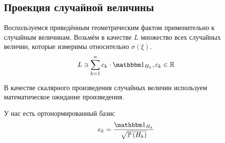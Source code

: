 \subsection{Проекция случайной величины}
Воспользуемся приведённым геометрическим фактом применительно к случайным
величинам.
Возьмём в качестве $L$ множество всех случайных величин, которые
измеримы относительно $\sigma\left( \xi \right)$.
$$L \ni \sum_{k=1}^n c_k \cdot \indicatorof{H_k}, c_k \in \mathbb{R}$$

В качестве скалярного произведения случайных величин
используем математическое ожидание произведения.

\begin{comment}
Оказывается, $H_k$ действительно ортогональны
$$k_1 \neq k_2
  \Rightarrow H_{k_1} \cap H_{k_2} = \emptyset
  \Rightarrow
  \Mean{ \indicatorof{H_{k_1}}\cdot \indicatorof{H_{k_1}} } = 0$$

Теперь нужно нормировать эти базисные вектора,
а для этого их надо поделить на их нормы.
В нашем пространстве норма порождена скалярным произведением,
то есть
$$\left\| x \right\| = \sqrt{\left( x,x \right)}
  = \sqrt{\Mean{ x \cdot x }}
  = \sqrt{\Mean{ x^2 }}, x \in L$$

Теперь у нас есть всё необходимое для того,
чтобы представить ортонормированный базис.
Начнём преобразования $H_k$
$$e_k = \frac{\indicatorof{H_k}}
  {\sqrt{\mean{\left( \indicatorof{H_k} \right)^2}}}$$

Поскольку индикатор может принимать лишь одно из двух значений $0$ или $1$,
а их квадраты равны им самим, то в формуле квадрат тоже можно убрать
$$e_k = \frac{\indicatorof{H_k}}{\sqrt{\mean{\indicatorof{H_k}}}}$$

Также помним, что математическое ожидание в знаменателе есть ни что иное,
как вероятность события $H_k$,
и теперь у нас есть красивый ортонормированный базис
\end{comment}
У нас есть ортонормированный базис
\begin{equation}\label{orthonormalBasis}
e_k = \frac{\indicatorof{H_k}}{\sqrt{\probability{H_k}}}
\end{equation}

